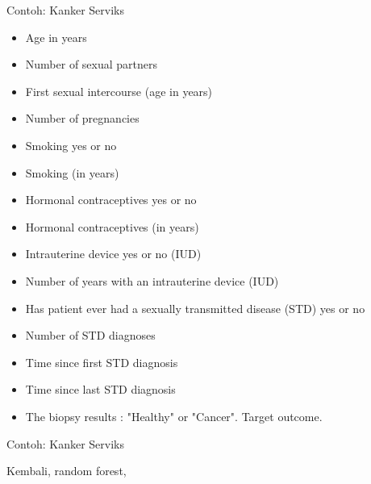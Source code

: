 \documentclass[aspectratio=169]{beamer}
\begin{document}
\begin{frame}{Contoh: Kanker Serviks \citep{cervical_cancer_(risk_factors)_383}}
	\begin{multicols}{2} 
	\begin{itemize}
		\item  \footnotesize Age in years
		\item  \footnotesize Number of sexual partners
		\item  \footnotesize First sexual intercourse (age in years)
		\item  \footnotesize Number of pregnancies
		\item  \footnotesize Smoking yes or no
		\item  \footnotesize Smoking (in years)
		\item  \footnotesize Hormonal contraceptives yes or no
	\end{itemize}
	\columnbreak
	\begin{itemize}
		\item  \footnotesize Hormonal contraceptives (in years)
\item  \footnotesize Intrauterine device yes or no (IUD)
\item  \footnotesize Number of years with an intrauterine device (IUD)
\item  \footnotesize Has patient ever had a sexually transmitted disease (STD) yes or no
\item  \footnotesize Number of STD diagnoses
\item  \footnotesize Time since first STD diagnosis
\item  \footnotesize Time since last STD diagnosis
\item  \footnotesize The biopsy results : "Healthy" or "Cancer". Target outcome.		
	\end{itemize}
\end{multicols}
\end{frame}

\begin{frame}{Contoh: Kanker Serviks}
	\begin{vfilleditems}
		\item Kembali, random forest, 
	\end{vfilleditems}
\end{frame}
\end{document}
